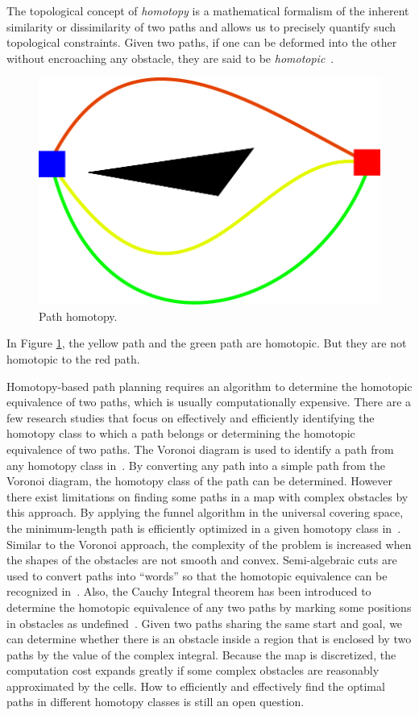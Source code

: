 \documentclass[phd]{byuprop}
\begin{document}
The topological concept of \emph{homotopy} is a mathematical formalism of the inherent similarity or dissimilarity of two paths and allows us to precisely quantify such topological constraints.
Given two paths, if one can be deformed into the other without encroaching any obstacle, they are said to be \emph{homotopic}~\cite{Hernandez2015}.
\begin{figure}[htbp]
	\centering
	\includegraphics[width=.2\textwidth]{fig/path_homotopy}
	\caption{Path homotopy.}
	\label{fig:homotopy:definition}
\end{figure}
In Figure \ref{fig:homotopy:definition}, the yellow path and the green path are homotopic.
But they are not homotopic to the red path.

Homotopy-based path planning requires an algorithm to determine the homotopic equivalence of two paths, which is usually computationally expensive. 
There are a few research studies that focus on effectively and efficiently identifying the homotopy class to which a path belongs or determining the homotopic equivalence of two paths. 
The Voronoi diagram is used to identify a path from any homotopy class in~\cite{Banerjee2013}. 
By converting any path into a simple path from the Voronoi diagram, the homotopy class of the path can be determined. 
However there exist limitations on finding some paths in a map with complex obstacles by this approach.
By applying the funnel algorithm in the universal covering space, the minimum-length path is efficiently optimized in a given homotopy class in~\cite{Hershberger1994}. 
Similar to the Voronoi approach, the complexity of the problem is increased when the shapes of the obstacles are not smooth and convex. 
Semi-algebraic cuts are used to convert paths into “words” so that the homotopic equivalence can be recognized in~\cite{Grigoriev1998}. 
Also, the Cauchy Integral theorem has been introduced to determine the homotopic equivalence of any two paths by marking some positions in obstacles as undefined~\cite{Bhattachary2010}. 
Given two paths sharing the same start and goal, we can determine whether there is an obstacle inside a region that is enclosed by two paths by the value of the complex integral. 
Because the map is discretized, the computation cost expands greatly if some complex obstacles are reasonably approximated by the cells.
How to efficiently and effectively find the optimal paths in different homotopy classes is still an open question.
\end{document}
